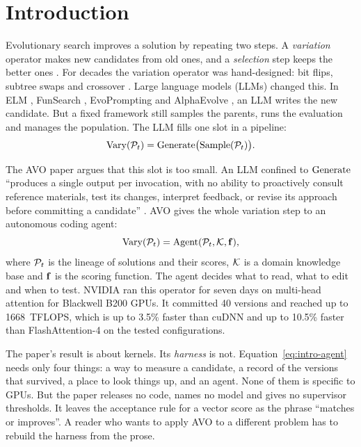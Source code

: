 \section{Introduction}
\label{sec:intro}

Evolutionary search improves a solution by repeating two steps. A \emph{variation} operator makes
new candidates from old ones, and a \emph{selection} step keeps the better ones
\citep{back1997handbook}. For decades the variation operator was hand-designed: bit flips,
subtree swaps and crossover \citep{oneill2010openissues}. Large language models (LLMs) changed this. In
ELM \citep{lehman2022elm}, FunSearch \citep{romeraparedes2024funsearch}, EvoPrompting
\citep{chen2023evoprompting} and AlphaEvolve \citep{novikov2025alphaevolve}, an LLM writes the new
candidate. But a fixed framework still samples the parents, runs the evaluation and manages the
population. The LLM fills one slot in a pipeline:
\begin{equation}
  \mathrm{Vary}(\mathcal{P}_t) = \mathrm{Generate}\big(\mathrm{Sample}(\mathcal{P}_t)\big).
  \label{eq:intro-generate}
\end{equation}

The AVO paper \citep{chen2026avo} argues that this slot is too small. An LLM confined to
$\mathrm{Generate}$ ``produces a single output per invocation, with no ability to proactively consult
reference materials, test its changes, interpret feedback, or revise its approach before committing
a candidate'' \citep[\S1]{chen2026avo}. AVO gives the whole variation step to an autonomous coding
agent:
\begin{equation}
  \mathrm{Vary}(\mathcal{P}_t) = \mathrm{Agent}(\mathcal{P}_t, \mathcal{K}, \mathbf{f}),
  \label{eq:intro-agent}
\end{equation}
where $\mathcal{P}_t$ is the lineage of solutions and their scores, $\mathcal{K}$ is a domain knowledge base and $\mathbf{f}$
is the scoring function. The agent decides what to read, what to edit and when to test. NVIDIA ran
this operator for seven days on multi-head attention for Blackwell B200 GPUs. It committed 40
versions and reached up to \SI{1668}{TFLOPS}, which is up to 3.5\% faster than cuDNN and up to
10.5\% faster than FlashAttention-4 on the tested configurations.

The paper's result is about kernels. Its \emph{harness} is not. Equation~\eqref{eq:intro-agent}
needs only four things: a way to measure a candidate, a record of the versions that survived, a
place to look things up, and an agent. None of them is specific to GPUs. But the paper releases no
code, names no model and gives no supervisor thresholds. It leaves the acceptance rule for a
vector score as the phrase ``matches or improves''. A reader who wants to apply AVO to a different
problem has to rebuild the harness from the prose.

